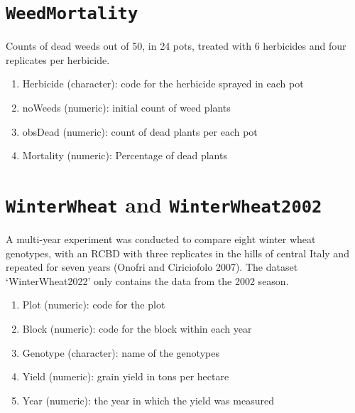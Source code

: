 \documentclass[
  letterpaper,
  DIV=11,
  numbers=noendperiod]{scrreprt}
\providecommand{\tightlist}{%
  \setlength{\itemsep}{0pt}\setlength{\parskip}{0pt}}
\begin{document}
\section*{\texorpdfstring{\texttt{WeedMortality}}{WeedMortality}}\label{weedmortality}


Counts of dead weeds out of 50, in 24 pots, treated with 6 herbicides
and four replicates per herbicide.

\begin{enumerate}
\def\labelenumi{\arabic{enumi}.}
\tightlist
\item
  Herbicide (character): code for the herbicide sprayed in each pot
\item
  noWeeds (numeric): initial count of weed plants
\item
  obsDead (numeric): count of dead plants per each pot
\item
  Mortality (numeric): Percentage of dead plants
\end{enumerate}

\section*{\texorpdfstring{\texttt{WinterWheat} and
\texttt{WinterWheat2002}}{WinterWheat and WinterWheat2002}}\label{winterwheat-and-winterwheat2002}


A multi-year experiment was conducted to compare eight winter wheat
genotypes, with an RCBD with three replicates in the hills of central
Italy and repeated for seven years (Onofri and Ciriciofolo 2007). The
dataset `WinterWheat2022' only contains the data from the 2002 season.

\begin{enumerate}
\def\labelenumi{\arabic{enumi}.}
\tightlist
\item
  Plot (numeric): code for the plot
\item
  Block (numeric): code for the block within each year
\item
  Genotype (character): name of the genotypes
\item
  Yield (numeric): grain yield in tons per hectare
\item
  Year (numeric): the year in which the yield was measured
\end{enumerate}
\end{document}
